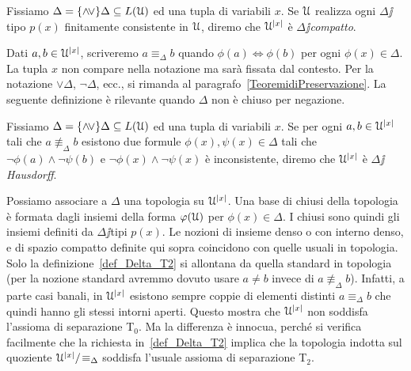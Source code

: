 \begin{definition}\label{def_Delta_ceompatto} Fissiamo $\Delta=\{\wedge\!\vee\}\Delta\subseteq L(\EuScript U)$ ed una tupla di variabili $x$. Se $\EuScript U$ realizza ogni  $\Delta\jj$tipo $p(x)$ finitamente consistente in $\EuScript U$, diremo che  $\EuScript U^{|x|}$ \`e \emph{$\Delta\jj$compatto}.\QED
\end{definition}

Dati $a,b\in\EuScript U^{|x|}$, scriveremo $a\equiv_{\Delta} b$ quando $\phi(a)\iff\phi(b)$ per ogni $\phi(x)\in\Delta$. La tupla $x$ non compare nella notazione ma sar\`a fissata dal contesto. Per la notazione $\vee\Delta$, $\neg\Delta$, ecc., si rimanda al paragrafo~\ref{TeoremidiPreservazione}. La seguente definizione \`e rilevante quando $\Delta$ non \`e chiuso per negazione.

\begin{definition}\label{def_Delta_T2}  Fissiamo $\Delta=\{\wedge\!\vee\}\Delta\subseteq L(\EuScript U)$ ed una tupla di variabili $x$. Se per ogni $a,b\in\EuScript U^{|x|}$ tali che $a\nequiv_{\Delta} b$ esistono due formule $\phi(x),\psi(x)\in\Delta$ tali che $\neg\phi(a)\wedge\neg\psi(b)$ e $\neg\phi(x)\wedge\neg\psi(x)$ \`e inconsistente, diremo che $\EuScript U^{|x|}$ \`e \emph{$\Delta\jj$Hausdorff}.\QED
\end{definition}

Possiamo associare a $\Delta$ una topologia su $\EuScript U^{|x|}$. Una base di chiusi della topologia \`e formata dagli insiemi della forma $\varphi(\EuScript U)$ per $\phi(x)\in\Delta$. I chiusi sono quindi gli insiemi definiti da $\Delta\jj$tipi $p(x)$. Le nozioni di insieme denso o con interno denso, e di spazio compatto definite qui sopra coincidono con quelle usuali in topologia. Solo la definizione~\ref{def_Delta_T2} si allontana da quella standard in topologia (per la nozione standard avremmo dovuto usare $a\neq b$ invece di $a\nequiv_{\Delta} b$). Infatti, a parte casi banali, in $\EuScript U^{|x|}$ esistono sempre coppie di elementi distinti $a\equiv_\Delta b$ che quindi hanno gli stessi intorni aperti. Questo mostra che $\EuScript U^{|x|}$ non soddisfa l'assioma di separazione T$_0$. Ma la differenza \`e innocua,  perch\'e si verifica facilmente che la richiesta in~\ref{def_Delta_T2} implica che la topologia indotta sul quoziente $\EuScript U^{|x|}/\!\equiv_{\Delta}$ soddisfa l'usuale assioma di separazione T$_2$.
% 

